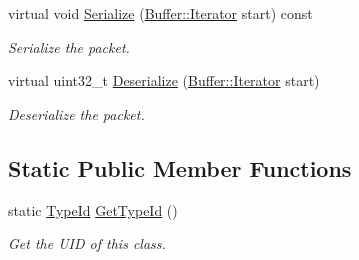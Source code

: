 \begin{DoxyCompactItemize}
virtual void \hyperlink{classns3_1_1Icmpv6NA_a0fa9ef58e0cb6c9a5ed1d4c82745a02f}{Serialize} (\hyperlink{classns3_1_1Buffer_1_1Iterator}{Buffer\+::\+Iterator} start) const 
\begin{DoxyCompactList}\small\item\em Serialize the packet. \end{DoxyCompactList}\item 
virtual uint32\+\_\+t \hyperlink{classns3_1_1Icmpv6NA_ade6ada5c42f4342a466139d75699718b}{Deserialize} (\hyperlink{classns3_1_1Buffer_1_1Iterator}{Buffer\+::\+Iterator} start)
\begin{DoxyCompactList}\small\item\em Deserialize the packet. \end{DoxyCompactList}\end{DoxyCompactItemize}
\subsection*{Static Public Member Functions}
\begin{DoxyCompactItemize}
\item 
static \hyperlink{classns3_1_1TypeId}{Type\+Id} \hyperlink{classns3_1_1Icmpv6NA_acecd45ab057bb4536a97c51b8a9946b3}{Get\+Type\+Id} ()
\begin{DoxyCompactList}\small\item\em Get the U\+ID of this class. \end{DoxyCompactList}\end{DoxyCompactItemize}

